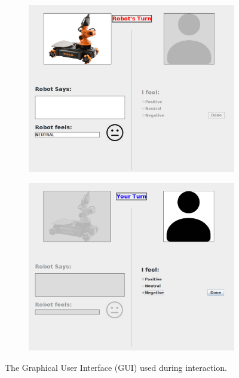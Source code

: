\documentclass[12pt]{report}
\begin{document}
\begin{figure}
\centering
\begin{subfigure}{.5\textwidth}
  \centering
  \includegraphics[width=.95\linewidth]{figure/robot-turn-gui.png}
  \label{fig:gui-robot}
\end{subfigure}%
\begin{subfigure}{.5\textwidth}
  \centering
  \includegraphics[width=.95\linewidth]{figure/human-turn-gui.png}
  \label{fig:gui-human}
\end{subfigure}
\caption{\fontsize{10}{10}\selectfont The Graphical User Interface (GUI) used
during interaction.}
\label{fig:gui}
\end{figure}
\end{document}
